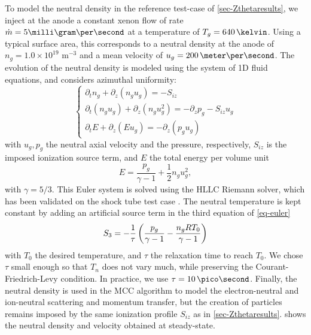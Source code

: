     To model the neutral density in the reference test-case of \cref{sec-Zthetaresults}, we inject at the anode a constant xenon flow of rate $\dot{m} = 5 \milli\gram\per\second$ at a temperature of $T_g = 640\,\kelvin$.
    Using a typical surface area, this corresponds to a neutral density at the anode of $n_g=1.0 \times 10^{19}$ {m}$^{-3}$ and a mean velocity of $u_g = 200 \,\meter\per\second$.
    The evolution of the neutral density is modeled using the system of \ac{1D} fluid equations, and considers azimuthal uniformity\string:
    \begin{equation}
    \left\{
    \begin{gathered}
    \partial_{t} n_g + \partial_{z}(n_g u_g) = - S_{iz}\\
    \partial_{t}(n_g u_g) + \partial_{z}(n_g u_g^{2}) = -\partial_{z}p_g - S_{iz} u_g \\
    \partial_{t}E + \partial_{z}(Eu_g) = - \partial_{z}(p_g u_g)
    \end{gathered}
    \right.
    \label{eq-euler}
    \end{equation}
    with $u_g, p_g$ the neutral axial velocity and the pressure, respectively, $S_{iz}$ is the imposed ionization source term, and $E$ the total energy per volume unit
    \begin{equation}
      E =  \frac{p_g}{\gamma - 1} + \frac{1}{2} n_g u_g^{2},
    \end{equation}
    with $\gamma=5/3$.
    This Euler system is solved using the HLLC Riemann solver, which has been validated on the  shock tube test case \citep{tordeux2018}.
    The neutral temperature is kept constant by adding an artificial source term in the third equation of \cref{eq-euler}
    \begin{equation} \label{eq-artificial}
      S_3 = -\frac{1}{\tau} \left(  \frac{p_g}{\gamma - 1} - \frac{n_g R T_0}{\gamma-1} \right)
    \end{equation}
    with $T_0$ the desired temperature, and $\tau$ the relaxation time to reach $T_0$.
    We chose $\tau$ small enough so that $T_n$ does not vary much, while preserving the Courant-Friedrich-Levy condition.
    In practice, we use $\tau = 10\,\pico\second$.
    Finally, the neutral density is used in the \ac{MCC} algorithm to model the electron-neutral and ion-neutral scattering and momentum transfer, but the creation of particles remains imposed by the same ionization profile $S_{iz}$ as in \cref{sec-Zthetaresults}.
     shows the neutral density and velocity obtained at steady-state.

